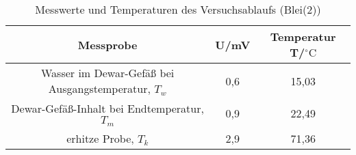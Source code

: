 \begin{table}[h]
	\begin{center}
		\begin{tabular}{ccc}
			Messprobe & U/mV & Temperatur T/$^{\circ}\mathrm{C}$\\ \hline
			Wasser im Dewar-Gefäß bei Ausgangstemperatur, $T_w$&0,6&15,03\\
			Dewar-Gefäß-Inhalt bei Endtemperatur, $T_m$&0,9&22,49\\
			erhitze Probe, $T_k$&2,9&71,36
		\end{tabular}
		\caption{Messwerte und Temperaturen des Versuchsablaufs (Blei(2))}
		\label{tabblei2}
	\end{center}
\end{table}